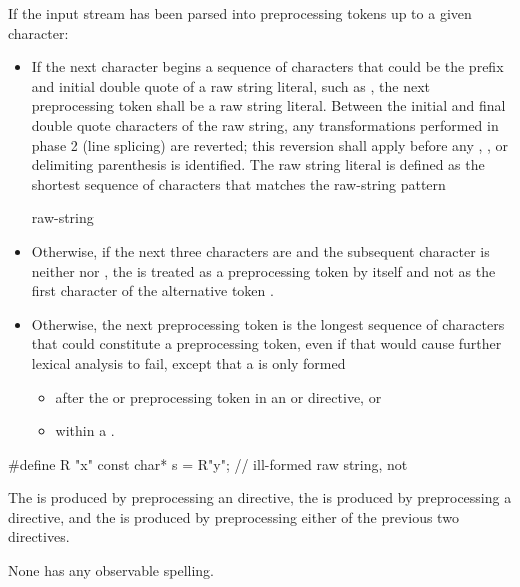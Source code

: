 \pnum
If the input stream has been parsed into preprocessing tokens up to a
given character:
\begin{itemize}
\item
{}%
If the next character begins a sequence of characters that could be the prefix
and initial double quote of a raw string literal, such as , the next preprocessing
token shall be a raw string literal. Between the initial and final
double quote characters of the raw string, any transformations performed in phase
2 (line splicing) are reverted; this reversion
shall apply before any , , or delimiting
parenthesis is identified. The raw string literal is defined as the shortest sequence
of characters that matches the raw-string pattern
\begin{ncbnf}
  raw-string
\end{ncbnf}

\item Otherwise, if the next three characters are \tcode{<::} and the subsequent character
is neither \tcode{:} nor \tcode{>}, the \tcode{<} is treated as a preprocessing token by
itself and not as the first character of the alternative token \tcode{<:}.

\item Otherwise,
the next preprocessing token is the longest sequence of
characters that could constitute a preprocessing token, even if that
would cause further lexical analysis to fail,
except that a  is only formed
\begin{itemize}
\item
after the  or  preprocessing token in an
 or
 directive, or

\item
within a .

\end{itemize}
\end{itemize}

\begin{example}
\begin{codeblock}
#define R "x"
const char* s = R"y";           // ill-formed raw string, not 
\end{codeblock}
\end{example}

\pnum
The  is produced
by preprocessing an  directive,
the  is produced
by preprocessing a  directive, and
the  is produced
by preprocessing either of the previous two directives.
\begin{note}
None has any observable spelling.
\end{note}

